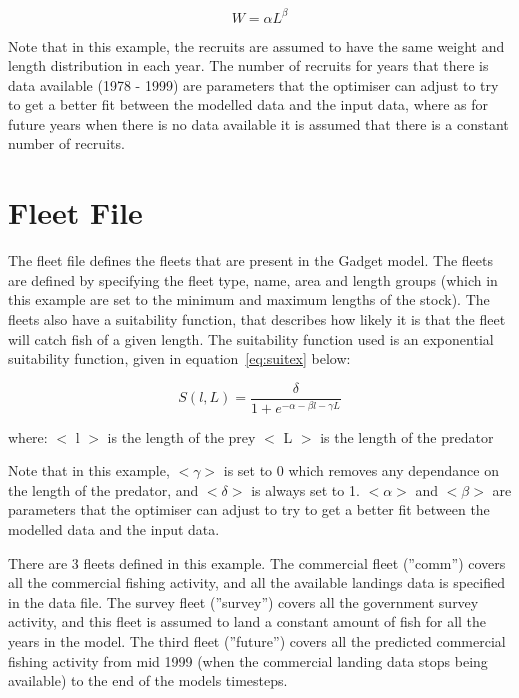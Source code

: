 \documentclass[10pt,twoside]{article}
\begin{document}
\begin{equation}\label{eq:wlenex}
W = \alpha L ^\beta
\end{equation}

Note that in this example, the recruits are assumed to have the same weight and length distribution in each year.  The number of recruits for years that there is data available (1978 - 1999) are parameters that the optimiser can adjust to try to get a better fit between the modelled data and the input data, where as for future years when there is no data available it is assumed that there is a constant number of recruits.

{\small }

\section{Fleet File}
The fleet file defines the fleets that are present in the Gadget model.  The fleets are defined by specifying the fleet type, name, area and length groups (which in this example are set to the minimum and maximum lengths of the stock).  The fleets also have a suitability function, that describes how likely it is that the fleet will catch fish of a given length.  The suitability function used is an exponential suitability function, given in equation~\ref{eq:suitex} below:

\begin{equation}\label{eq:suitex}
S(l,L) = { \frac{\delta}{1 + e^{- \alpha - \beta l - \gamma  L}}}
\end{equation}

where:\newline
$<$ l $>$ is the length of the prey\newline
$<$ L $>$ is the length of the predator

\bigskip
Note that in this example, $<\gamma>$ is set to 0 which removes any dependance on the length of the predator, and $<\delta>$ is always set to 1.   $<\alpha>$ and $<\beta>$ are parameters that the optimiser can adjust to try to get a better fit between the modelled data and the input data.

\bigskip
There are 3 fleets defined in this example.  The commercial fleet (''comm'') covers all the commercial fishing activity, and all the available landings data is specified in the data file.  The survey fleet (''survey'') covers all the government survey activity, and this fleet is assumed to land a constant amount of fish for all the years in the model.  The third fleet (''future'') covers all the predicted commercial fishing activity from mid 1999 (when the commercial landing data stops being available) to the end of the models timesteps.
\end{document}
